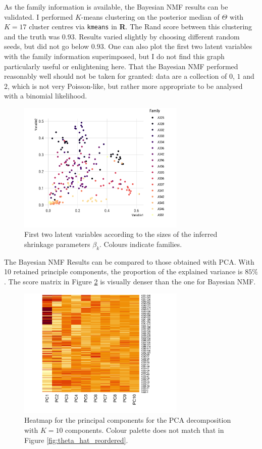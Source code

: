 \documentclass[]{article}
\begin{document}
As the family information is available, the Bayesian NMF results can be validated. I performed $K$-means clustering on the posterior median of ${\Theta}$ with $K=17$ cluster centres via \texttt{kmeans} in {\bf R}. The Rand score between this clustering and the truth was 0.93. Results varied slightly by choosing different random seeds, but did not go below $0.93$. One can also plot the first two latent variables with the family information superimposed, but I do not find this graph particularly useful or enlightening here. That the Bayesian NMF performed reasonably well should not be taken for granted: data are a collection of $0$, $1$ and $2$, which is not very Poisson-like, but rather more appropriate to be analysed with a binomial likelihood.

\begin{figure}
	\centering
	\includegraphics[width=8cm]{2var_apple.png}
	\caption{First two latent variables according to the sizes of the inferred shrinkage parameters $\beta_k$. Colours indicate families.}
	\label{fig:2var_apple}
\end{figure}

The Bayesian NMF Results can be compared to those obtained with PCA. With 10 retained principle components, the proportion of the explained variance is $85\%$. The score matrix in Figure \ref{fig:pca_scores_apple} is visually denser than the one for Bayesian NMF.

\begin{figure}
	\centering
	\includegraphics[width=8cm]{pca_scores_apple.png}
	\caption{Heatmap for the principal components for the PCA decomposition with $K=10$ components. Colour palette does not match that in Figure \ref{fig:theta_hat_reordered}.}
	\label{fig:pca_scores_apple}
\end{figure}
\end{document}
